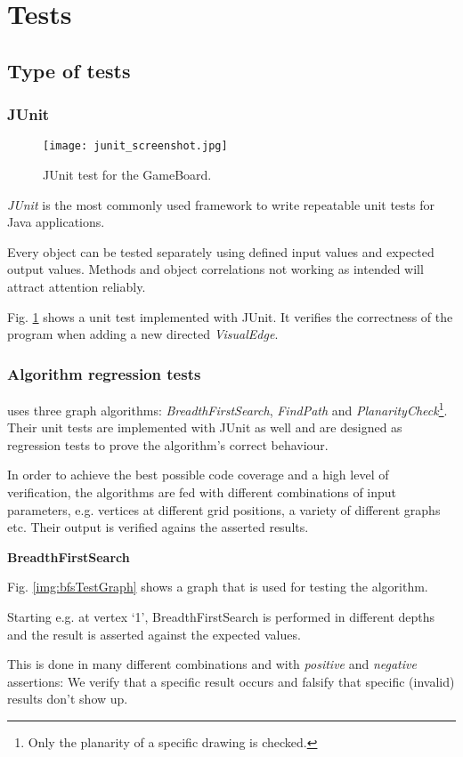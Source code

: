 \section{Tests}
\label{section:tests}

\subsection{Type of tests}

\subsubsection{JUnit}

\begin{figure}[h]
	\centering
	\texttt{[image: junit\_screenshot.jpg]}
	\caption{JUnit test for the GameBoard.}
	\label{img:screenJUnit}
\end{figure}
\emph{JUnit} is the most commonly used framework to write repeatable unit tests for Java applications.\par
Every object can be tested separately using defined input values and expected output values. Methods and object correlations not working as intended will attract attention reliably.\par
Fig. \ref{img:screenJUnit} shows a unit test implemented with JUnit. It verifies the correctness of the program when adding a new directed \emph{VisualEdge}.

\subsubsection{Algorithm regression tests}

\graphioli uses three graph algorithms: \emph{BreadthFirstSearch}, \emph{FindPath} and \emph{PlanarityCheck}\footnote{Only the planarity of a specific drawing is checked.}. Their unit tests are implemented with JUnit as well and are designed as regression tests to prove the algorithm's correct behaviour.\par
In order to achieve the best possible code coverage and a high level of verification, the algorithms are fed with different combinations of input parameters, e.g. vertices at different grid positions, a variety of different graphs etc. Their output is verified agains the asserted results.\par

\textbf{BreadthFirstSearch}\par
Fig. \ref{img:bfsTestGraph} shows a graph that is used for testing the algorithm.\par
Starting e.g. at vertex `1', BreadthFirstSearch is performed in different depths and the result is asserted against the expected values.\par
This is done in many different combinations and with \emph{positive} and \emph{negative} assertions: We verify that a specific result occurs and falsify that specific (invalid) results don't show up.\par

